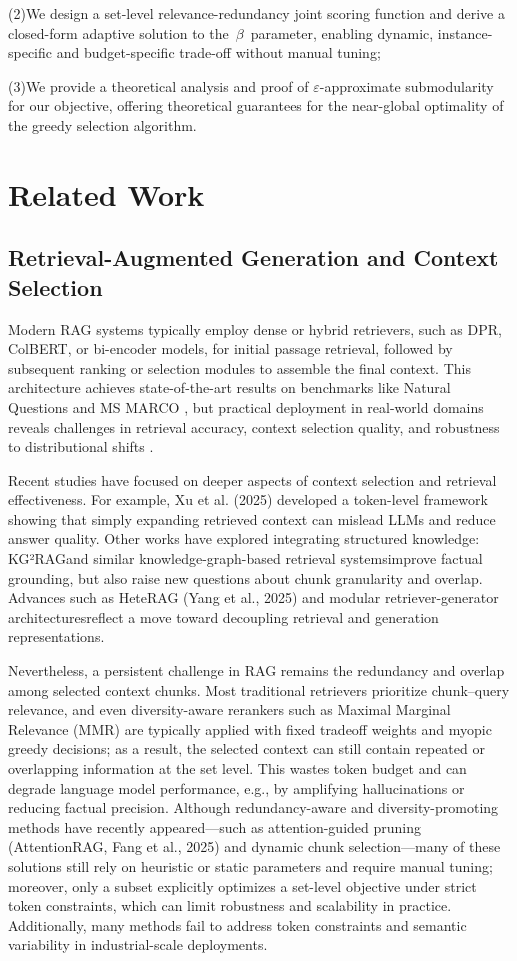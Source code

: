 \documentclass[11pt]{article}
\begin{document}
(2)We design a set-level relevance-redundancy joint scoring function and derive a closed-form adaptive solution to the $\beta$ parameter, enabling dynamic, instance-specific and budget-specific trade-off without manual tuning;

(3)We provide a theoretical analysis and proof of $\varepsilon$-approximate submodularity for our objective, offering theoretical guarantees for the near-global optimality of the greedy selection algorithm.


\section{Related Work}
\subsection{Retrieval-Augmented Generation and Context Selection}
Modern RAG systems typically employ dense or hybrid retrievers, such as DPR\cite{2}, ColBERT\cite{3}, or bi-encoder models, for initial passage retrieval, followed by subsequent ranking or selection modules to assemble the final context. This architecture achieves state-of-the-art results on benchmarks like Natural Questions and MS MARCO \cite{6,14}, but practical deployment in real-world domains reveals challenges in retrieval accuracy, context selection quality, and robustness to distributional shifts \cite{8,15,16}.

Recent studies have focused on deeper aspects of context selection and retrieval effectiveness. For example, Xu et al. (2025) developed a token-level framework showing that simply expanding retrieved context can mislead LLMs and reduce answer quality. Other works have explored integrating structured knowledge: KG²RAG\cite{9}and similar knowledge-graph-based retrieval systems\cite{10}improve factual grounding, but also raise new questions about chunk granularity and overlap. Advances such as HeteRAG (Yang et al., 2025) and modular retriever-generator architectures\cite{11,12}reflect a move toward decoupling retrieval and generation representations.

Nevertheless, a persistent challenge in RAG remains the redundancy and overlap among selected context chunks. Most traditional retrievers prioritize chunk–query relevance, and even diversity-aware rerankers such as Maximal Marginal Relevance (MMR) are typically applied with fixed tradeoff weights and myopic greedy decisions; as a result, the selected context can still contain repeated or overlapping information at the set level. This wastes token budget and can degrade language model performance, e.g., by amplifying hallucinations or reducing factual precision. Although redundancy-aware and diversity-promoting methods have recently appeared—such as attention-guided pruning (AttentionRAG, Fang et al., 2025) and dynamic chunk selection—many of these solutions still rely on heuristic or static parameters and require manual tuning; moreover, only a subset explicitly optimizes a set-level objective under strict token constraints, which can limit robustness and scalability in practice\cite{14}. Additionally, many methods fail to address token constraints and semantic variability in industrial-scale deployments\cite{15,16,17}.
\end{document}
